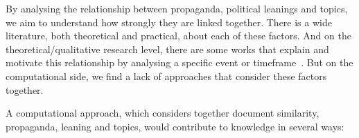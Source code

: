 
By analysing the relationship between propaganda, political leanings and topics, we aim to understand how strongly they are linked together. There is a wide literature, both theoretical and practical, about each of these factors.
And on the theoretical/qualitative research level, there are some works that explain and motivate this relationship by analysing a specific event or timeframe~\citep{pierri2023propaganda,golovchenko2020cross,blumberg1986comparative}.
But on the computational side, we find a lack of approaches that consider these factors together.

A computational approach, which considers together document similarity, propaganda, leaning and topics, would contribute to knowledge in several ways:



